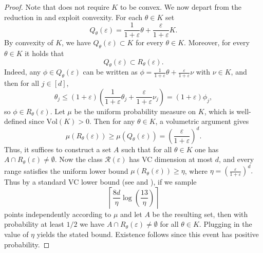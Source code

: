\documentclass[11pt]{article}
\newcommand{\vol}{\mathrm{Vol}}
\renewcommand{\le}{\leqslant}
\renewcommand{\ge}{\geqslant}
\newcommand{\eps}{\varepsilon}
\renewcommand{\triangleq}{=}
\theoremstyle{definition}
\theoremstyle{remark}
\begin{document}
\begin{proof}
Note that  does not require $K$ to be convex. We now depart from the reduction in \cite{diakonikolas2010small} and exploit convexity. For each $\theta \in K$ set
\[
Q_\theta(\varepsilon) \triangleq \frac{1}{1+\varepsilon}\theta + \frac{\varepsilon}{1+\varepsilon}K.
\]
By convexity of $K$, we have $Q_\theta(\varepsilon) \subset K$ for every $\theta \in K$. Moreover, for every $\theta \in K$ it holds that
\[
Q_\theta(\varepsilon) \subset R_\theta(\varepsilon).
\]
Indeed, any $\phi \in Q_\theta(\varepsilon)$ can be written as $\phi = \frac{1}{1+\varepsilon}\theta + \frac{\varepsilon}{1+\varepsilon}\nu$ with $\nu \in K$, and then for all $j \in [d]$,
\[
\theta_j \le (1 + \varepsilon)\left(\frac{1}{1+\varepsilon}\theta_j + \frac{\varepsilon}{1+\varepsilon}\nu_j\right) = (1 + \varepsilon)\phi_j,
\]
so $\phi \in R_\theta(\varepsilon)$. Let $\mu$ be the uniform probability measure on $K$, which is well-defined since $\vol(K)>0$. Then for any $\theta \in K$, a volumetric argument gives
\[
\mu(R_\theta(\varepsilon)) \ge \mu(Q_\theta(\varepsilon)) = \left(\frac{\varepsilon}{1 + \varepsilon}\right)^d.
\]
Thus, it suffices to construct a set $A$ such that for all $\theta \in K$ one has $A \cap R_\theta(\varepsilon) \neq \emptyset$.
Now the class $\mathcal{R} (\eps)$ has VC dimension at most $d$, and
every range satisfies the uniform lower bound $\mu(R_\theta(\varepsilon)) \ge \eta$, where
$
\eta = \left(\frac{\varepsilon}{1 + \varepsilon}\right)^d.
$
Thus %
by a standard VC lower bound
(see \cite{haussler1986epsilon} and \cite[Theorem~2.1]{blumer1989learnability}), if we sample
\[
\left\lceil\frac{8d}{\eta}\log\left(\frac{13}{\eta}\right)\right\rceil
\]
points independently according to $\mu$ and let $A$ be the resulting set, then with probability at least $1/2$ we have $A \cap R_\theta(\varepsilon) \neq \emptyset$ for all $\theta \in K$. Plugging in the value of $\eta$ yields the stated bound. Existence follows since this event has positive probability.
\end{proof}
\end{document}

